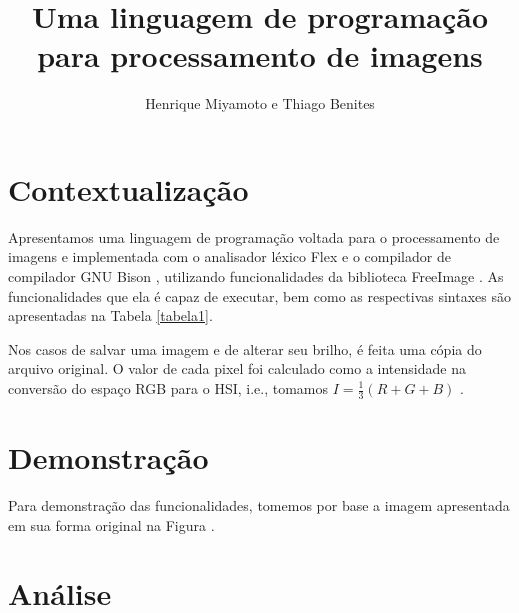 \documentclass[a4paper, 10pt, conference]{ieeeconf}
\title{\LARGE \bf Uma linguagem de programação para processamento de imagens}
\author{Henrique Miyamoto e Thiago Benites}
\begin{document}
\maketitle
\thispagestyle{empty}
\pagestyle{empty}




\section{Contextualização}


Apresentamos uma linguagem de programação voltada para o processamento de imagens e implementada com o analisador léxico Flex \cite{flex} e o compilador de compilador GNU Bison \cite{bison}, utilizando funcionalidades da biblioteca FreeImage \cite{freeimage}. As funcionalidades que ela é capaz de executar, bem como as respectivas sintaxes são apresentadas na Tabela \ref{tabela1}.

Nos casos de salvar uma imagem e de alterar seu brilho, é feita uma cópia do arquivo original. O valor de cada pixel foi calculado como a intensidade na conversão do espaço RGB para o HSI, i.e., tomamos $I=\frac{1}{3}(R+G+B)$ \cite{rgb}.



\section{Demonstração}

Para demonstração das funcionalidades, tomemos por base a imagem apresentada em sua forma original na Figura \cite{figura1}.


\section{Análise}
\end{document}
